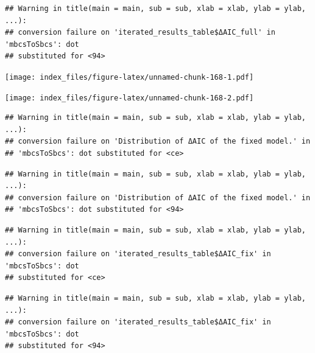 \documentclass[
]{article}
\newenvironment{Shaded}{\begin{snugshade}}{\end{snugshade}}
\newcommand{\AttributeTok}[1]{\textcolor[rgb]{0.77,0.63,0.00}{#1}}
\newcommand{\FunctionTok}[1]{\textcolor[rgb]{0.00,0.00,0.00}{#1}}
\newcommand{\NormalTok}[1]{#1}
\newcommand{\SpecialCharTok}[1]{\textcolor[rgb]{0.00,0.00,0.00}{#1}}
\newcommand{\StringTok}[1]{\textcolor[rgb]{0.31,0.60,0.02}{#1}}
\begin{document}
\begin{verbatim}
## Warning in title(main = main, sub = sub, xlab = xlab, ylab = ylab, ...):
## conversion failure on 'iterated_results_table$ΔAIC_full' in 'mbcsToSbcs': dot
## substituted for <94>
\end{verbatim}

\texttt{[image: index\_files/figure-latex/unnamed-chunk-168-1.pdf]}

\begin{Shaded}
\end{Shaded}

\texttt{[image: index\_files/figure-latex/unnamed-chunk-168-2.pdf]}

\begin{Shaded}
\end{Shaded}

\begin{verbatim}
## Warning in title(main = main, sub = sub, xlab = xlab, ylab = ylab, ...):
## conversion failure on 'Distribution of ΔAIC of the fixed model.' in
## 'mbcsToSbcs': dot substituted for <ce>
\end{verbatim}

\begin{verbatim}
## Warning in title(main = main, sub = sub, xlab = xlab, ylab = ylab, ...):
## conversion failure on 'Distribution of ΔAIC of the fixed model.' in
## 'mbcsToSbcs': dot substituted for <94>
\end{verbatim}

\begin{verbatim}
## Warning in title(main = main, sub = sub, xlab = xlab, ylab = ylab, ...):
## conversion failure on 'iterated_results_table$ΔAIC_fix' in 'mbcsToSbcs': dot
## substituted for <ce>
\end{verbatim}

\begin{verbatim}
## Warning in title(main = main, sub = sub, xlab = xlab, ylab = ylab, ...):
## conversion failure on 'iterated_results_table$ΔAIC_fix' in 'mbcsToSbcs': dot
## substituted for <94>
\end{verbatim}
\end{document}
